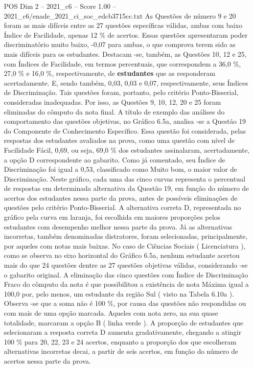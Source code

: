 \begin{textsample}{POS Dim 2 – 2021\_c6 – Score 1.00 – 2021\_c6/enade\_2021\_ci\_soc\_edcb3715cc.txt}
As Questões de número 9 e 20 foram as mais difíceis entre as 27 questões específicas válidas, ambas com baixo Índice de Facilidade, apenas 12 \% de acertos.
Essas questões apresentaram poder discriminatório muito baixo, -0,07 para ambas, o que comprova terem sido as mais difíceis para os estudantes.
Destacam -se, também, as Questões 10, 12 e 25, com Índices de Facilidade, em termos percentuais, que correspondem a 36,0 \%, 27,0 \% e 16,0 \%, respectivamente, de \textbf{estudantes} que as responderam acertadamente.
E, sendo também, 0,03, 0,03 e 0,07, respectivamente, seus Índices de Discriminação.
Tais questões foram, portanto, pelo critério Ponto-Bisserial, consideradas inadequadas.
Por isso, as Questões 9, 10, 12, 20 e 25 foram eliminadas do cômputo da nota final.
A título de exemplo das análises do comportamento das questões objetivas, no Gráfico 6.5a, analisa -se a Questão 19 do Componente de Conhecimento Específico.
Essa questão foi considerada, pelas respostas dos estudantes avaliados na prova, como uma questão com nível de Facilidade Fácil, 0,69, ou seja, 69,0 \% dos estudantes assinalaram, acertadamente, a opção D correspondente ao gabarito.
Como já comentado, seu Índice de Discriminação foi igual a 0,53, classificado como Muito bom, o maior valor de Discriminação.
Neste gráfico, cada uma das cinco curvas representa o percentual de respostas em determinada alternativa da Questão 19, em função do número de acertos dos estudantes nessa parte da prova, antes de possíveis eliminações de questões pelo critério Ponto-Bisserial.
A alternativa correta D, representada no gráfico pela curva em laranja, foi escolhida em maiores proporções pelos estudantes com desempenho melhor nessa parte da prova.
Já as alternativas incorretas, também denominadas distratores, foram selecionadas, principalmente, por aqueles com notas mais baixas.
No caso de Ciências Sociais ( Licenciatura ), como se observa no eixo horizontal do Gráfico 6.5a, nenhum estudante acertou mais do que 24 questões dentre as 27 questões objetivas válidas, considerando -se o gabarito original.
A eliminação das cinco questões com Índice de Discriminação Fraco do cômputo da nota é que possibilitou a existência de nota Máxima igual a 100,0 por, pelo menos, um estudante da região Sul ( visto na Tabela 6.10a ).
Observa -se que a soma não é 100 \%, por causa das questões não respondidas ou com mais de uma opção marcada.
Aqueles com nota zero, na sua quase totalidade, marcaram a opção B ( linha verde ).
A proporção de estudantes que selecionaram a resposta correta D aumenta gradativamente, chegando a atingir 100 \% para 20, 22, 23 e 24 acertos, enquanto a proporção dos que escolheram alternativas incorretas decai, a partir de seis acertos, em função do número de acertos nessa parte da prova.

\end{textsample}
